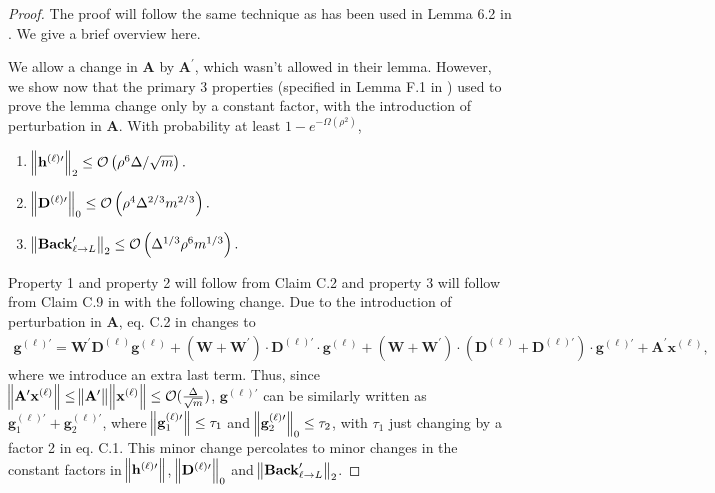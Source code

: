 \begin{proof}
	The proof will follow the same technique as has been used in Lemma 6.2 in \cite{allen2019can}. We give a brief overview here. 
	
	We allow a change in $\mathbf{A}$ by $\mathbf{A}^{\prime}$, which wasn't allowed in their lemma. However, we show now that the primary 3 properties (specified in Lemma F.1 in \cite{allen2019can}) used to prove the lemma change only by a constant factor, with the introduction of perturbation in $\mathbf{A}$. With probability at least $1-e^{-\Omega(\rho^2)}$,
	\begin{enumerate}
		\item $\norm{\mathbf{h}^{(\ell)\prime}}_2 \leq \mathcal{O}\left(\rho^{6} \Delta / \sqrt{m}\right).$ 
		\item $\norm{\mathbf{D}^{(\ell)\prime}}_{0} \leq \mathcal{O}\left(\rho^{4} \Delta^{2 / 3} m^{2 / 3}\right).$
		\item $\norm{ \mathbf{Back}_{\ell \rightarrow L}^{\prime} }_{2} \leq \mathcal{O}\left(\Delta^{1 / 3} \rho^{6} m^{1 / 3}\right).$
	\end{enumerate}
	Property 1 and property 2 will follow from Claim C.2 and property 3 will follow from Claim C.9 in \cite{allen2019convergence_rnn} with the following change. Due to the introduction of perturbation in $\mathbf{A}$, eq. C.2 in \cite{allen2019convergence_rnn} changes to
	\begin{align*}
		\mathbf{g}^{(\ell)\prime} = \mathbf{W}^{\prime} \mathbf{D}^{(\ell)} \mathbf{g}^{(\ell)} + (\mathbf{W} + \mathbf{W}^{\prime})\cdot \mathbf{D}^{(\ell)\prime}\cdot \mathbf{g}^{(\ell)} + (\mathbf{W} + \mathbf{W}^{\prime}) \cdot  (\mathbf{D}^{(\ell)} + \mathbf{D}^{(\ell)\prime}) \cdot  \mathbf{g}^{(\ell)\prime} + \mathbf{A}^{\prime} \mathbf{x}^{(\ell)},
	\end{align*}
	where we introduce an extra last term. Thus, since $\norm{\mathbf{A}^{\prime} \mathbf{x}^{(\ell)}} \le \norm{\mathbf{A}^{\prime}} \norm{\mathbf{x}^{(\ell)}} \le \mathcal{O}(\frac{\Delta}{\sqrt{m}})$, $\mathbf{g}^{(\ell)\prime}$ can be similarly written as $\mathbf{g}^{(\ell)\prime}_1 + \mathbf{g}^{(\ell)\prime}_2$, where $\norm{\mathbf{g}^{(\ell)\prime}_1} \le \tau_1$ and $\norm{\mathbf{g}^{(\ell)\prime}_2}_0 \le \tau_2$, with $\tau_1$ just changing by a factor 2 in eq. C.1\cite{allen2019convergence_rnn}. This minor change percolates to minor changes in the constant factors in $\norm{\mathbf{h}^{(\ell)\prime}}$, $\norm{\mathbf{D}^{(\ell)\prime}}_{0}$ and $\norm{ \mathbf{Back}_{\ell \rightarrow L}^{\prime} }_{2}$.
	

\end{proof}
